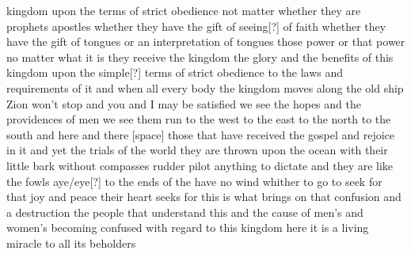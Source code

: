 kingdom upon the terms of strict obedience not matter whether they are prophets apostles whether they have the gift of seeing[?] of faith whether they have the gift of tongues or an interpretation of tongues those power or that power no matter what it is they receive the kingdom the glory and the benefits of this kingdom upon the simple[?] terms of strict obedience to the laws and requirements of it and when all every body the kingdom moves along the old ship Zion won't stop and you and I may be satisfied we see the hopes and the providences of men we see them run to the west to the east to the north to the south and here and there [space] those that have received the gospel and rejoice in it and yet the trials of the world they are thrown upon the ocean with their little bark without compasses rudder pilot anything to dictate and they are like the fowls aye/eye[?] to the ends of the have no wind whither to go to seek for that joy and peace their heart seeks for this is what brings on that confusion and a destruction the people that understand this and the cause of men's and women's becoming confused with regard to this kingdom here it is a living miracle to all its beholders
